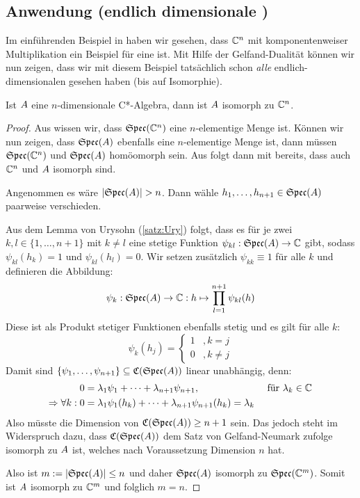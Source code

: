 \subsection{Anwendung (endlich dimensionale \CAlgn)}\label{sec:Anwendung}

Im einführenden Beispiel in  haben wir gesehen, dass $\mathbb{C}^n$ mit komponentenweiser Multiplikation ein Beispiel für eine \CAlg{} ist. Mit Hilfe der Gelfand-Dualität können wir nun zeigen, dass wir mit diesem Beispiel tatsächlich schon \emph{alle} endlich-dimensionalen \CAlgn{} gesehen haben (bis auf Isomorphie).

\begin{lemma}
Ist $A$ eine $n$-dimensionale C*-Algebra, dann ist $A$ isomorph zu $\mathbb{C}^n$.
\end{lemma}

\begin{proof}Aus  wissen wir, dass $\mathfrak{Spec}(\mathbb{C}^n)$ eine $n$-elementige Menge ist. Können wir nun zeigen, dass $\mathfrak{Spec}(A)$ ebenfalls eine $n$-elementige Menge ist, dann müssen $\mathfrak{Spec}(\mathbb{C}^n)$ und $\mathfrak{Spec}(A)$ homöomorph sein. Aus  folgt dann mit  bereits, dass auch $\mathbb{C}^n$ und $A$ isomorph sind.

Angenommen es wäre $|\mathfrak{Spec}(A)| > n$. Dann wähle $h_1, \dots, h_{n+1} \in \mathfrak{Spec}(A)$ paarweise verschieden. 

Aus dem Lemma von Urysohn (\ref{satz:Ury}) folgt, dass es für je zwei $k, l \in \{1, \dots, n+1\}$ mit $k \neq l$ eine stetige Funktion $\psi_{kl}: \mathfrak{Spec}(A) \to \mathbb{C}$ gibt, sodass $\psi_{kl}(h_k) = 1$ und $\psi_{kl}(h_l) = 0$. Wir setzen zusätzlich $\psi_{kk} \equiv 1$ für alle $k$ und definieren die Abbildung:
	\[\psi_k: \mathfrak{Spec}(A) \to \mathbb{C}: h \mapsto \prod_{l=1}^{n+1}\psi_{kl}(h)\]
Diese ist als Produkt stetiger Funktionen ebenfalls stetig und es gilt für alle $k$:
	\[\psi_k(h_j) = \begin{cases} 1 &, k=j \\ 0 &, k\neq j \end{cases}\]
Damit sind $\{\psi_1, \dots, \psi_{n+1}\} \subseteq \mathfrak{C}(\mathfrak{Spec}(A))$ linear unabhängig, denn:
	\begin{align*}
							 0 &= \lambda_1\psi_1 + \dots + \lambda_{n+1}\psi_{n+1}, &\text{ für } \lambda_k \in \mathbb{C} \\
	\Rightarrow \forall k:   0 &= \lambda_1\psi_1(h_k) + \dots + \lambda_{n+1}\psi_{n+1}(h_k) = \lambda_k &
	\end{align*}
Also müsste die Dimension von $\mathfrak{C}(\mathfrak{Spec}(A)) \geq n+1$ sein. Das jedoch steht im Widerspruch dazu, dass $\mathfrak{C}(\mathfrak{Spec}(A))$ dem Satz von Gelfand-Neumark zufolge isomorph zu $A$ ist, welches nach Voraussetzung Dimension $n$ hat.

Also ist $m := |\mathfrak{Spec}(A)| \leq n$ und daher $\mathfrak{Spec}(A)$ isomorph zu $\mathfrak{Spec}(\mathbb{C}^m)$. Somit ist $A$ isomorph zu $\mathbb{C}^m$ und folglich $m = n$.
\end{proof}
